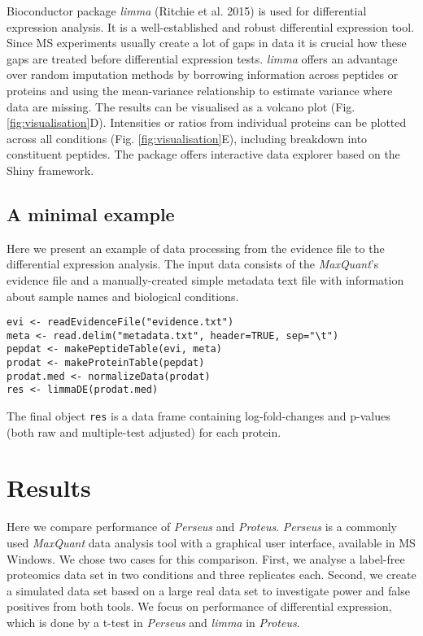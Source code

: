 \documentclass[]{article}
\begin{document}
Bioconductor package \emph{limma} (Ritchie et al. 2015) is used for
differential expression analysis. It is a well-established and robust
differential expression tool. Since MS experiments usually create a lot
of gaps in data it is crucial how these gaps are treated before
differential expression tests. \emph{limma} offers an advantage over
random imputation methods by borrowing information across peptides or
proteins and using the mean-variance relationship to estimate variance
where data are missing. The results can be visualised as a volcano plot
(Fig. \ref{fig:visualisation}D). Intensities or ratios from individual
proteins can be plotted across all conditions (Fig.
\ref{fig:visualisation}E), including breakdown into constituent
peptides. The package offers interactive data explorer based on the
Shiny framework.

\subsection{A minimal example}\label{a-minimal-example}

Here we present an example of data processing from the evidence file to
the differential expression analysis. The input data consists of the
\emph{MaxQuant}'s evidence file and a manually-created simple metadata
text file with information about sample names and biological conditions.

\begin{verbatim}
evi <- readEvidenceFile("evidence.txt") 
meta <- read.delim("metadata.txt", header=TRUE, sep="\t") 
pepdat <- makePeptideTable(evi, meta)
prodat <- makeProteinTable(pepdat)
prodat.med <- normalizeData(prodat)
res <- limmaDE(prodat.med)
\end{verbatim}

The final object \texttt{res} is a data frame containing
log-fold-changes and p-values (both raw and multiple-test adjusted) for
each protein.

\section{Results}\label{results}

Here we compare performance of \emph{Perseus} and \emph{Proteus}.
\emph{Perseus} is a commonly used \emph{MaxQuant} data analysis tool
with a graphical user interface, available in MS Windows. We chose two
cases for this comparison. First, we analyse a label-free proteomics
data set in two conditions and three replicates each. Second, we create
a simulated data set based on a large real data set to investigate power
and false positives from both tools. We focus on performance of
differential expression, which is done by a t-test in \emph{Perseus} and
\emph{limma} in \emph{Proteus}.
\end{document}
